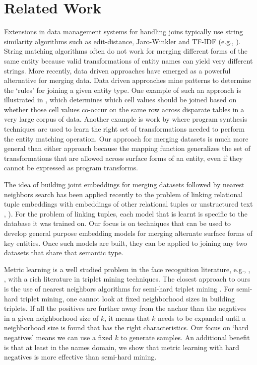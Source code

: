 \section{Related Work}
Extensions in data management systems for handling joins typically use string similarity algorithms such as edit-distance, Jaro-Winkler and TF-IDF (e.g., \cite{Cohen2003}).  String matching algorithms often do not work for merging different forms of the same entity because valid transformations of entity names can yield very different strings.  More recently, data driven approaches have emerged as a powerful alternative for merging data.  Data driven approaches mine patterns to determine the `rules' for joining a given entity type.  One example of such an approach is illustrated in \cite{He:2015:SJS:2824032.2824036}, which determines which cell values should be joined based on whether those cell values co-occur on the same row across disparate tables in a very large corpus of data.  Another example is work by \cite{auto-join-joining-tables-leveraging-transformations} where program synthesis techniques are used to learn the right set of transformations needed to perform the entity matching operation.  Our approach for merging datasets is much more general than either approach because the mapping function generalizes the set of transformations that are allowed across surface forms of an entity, even if they cannot be expressed as program transforms.

The idea of building joint embeddings for merging datasets followed by nearest neighbors search has been applied recently to the problem of linking relational tuple embeddings with embeddings of other relational tuples or unstructured text \cite{Bordawekar18}, \cite{IDEL18}).  For the problem of linking tuples, each model that is learnt is specific to the database it was trained on.  Our focus is on techniques that can be used to develop general purpose embedding models for merging alternate surface forms of key entities.  Once such models are built, they can be applied to joining any two datasets that share that semantic type.

Metric learning is a well studied problem in the face recognition literature, e.g., \cite{DBLP:conf/cvpr/2014}, \cite{DBLP:conf/cvpr/SchroffKP15}, with a rich literature in triplet mining techniques.  The closest approach to ours is the use of nearest neighbors algorithms for semi-hard triplet mining \cite{DBLP:journals/corr/KumarHC0D17}.  For semi-hard triplet mining, one cannot look at fixed neighborhood sizes in building triplets.  If all the positives are further away from the anchor than the negatives in a given neighborhood size of $k$, it means that $k$ needs to be expanded until a neighborhood size is found that has the right characteristics.  Our focus on `hard negatives' means we can use a fixed $k$ to generate samples.  An additional benefit is that at least in the names domain, we show that metric learning with hard negatives is more effective than semi-hard mining.


